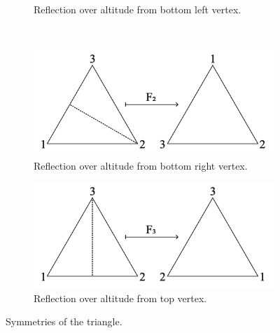 \documentclass{amsart}
\begin{document}
\begin{example}
\begin{figure}[!ht]
\begin{subfigure}{.5\textwidth}
			\caption{Reflection over altitude from bottom left vertex.}
		\end{subfigure}%
		\\
		\begin{subfigure}{.5\textwidth}
			\centering
			\includegraphics[width=.9\linewidth]{Inkscape Files/D3F2.png}
			\caption{Reflection over altitude from bottom right vertex.}
		\end{subfigure}%
		\begin{subfigure}{.5\textwidth}
			\centering
			\includegraphics[width=.9\linewidth]{Inkscape Files/D3F3.png}
			\caption{Reflection over altitude from top vertex.}
		\end{subfigure}
		\caption{Symmetries of the triangle.}
		\label{D3elements}
	\end{figure}


\end{example}
\end{document}

